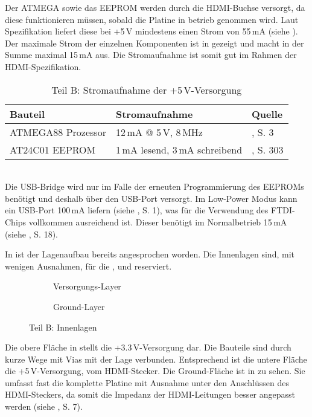 Der ATMEGA sowie das EEPROM werden durch die HDMI-Buchse versorgt, da diese funktionieren müssen, sobald die Platine in betrieb genommen wird. Laut Spezifikation liefert diese bei +5\,V mindestens einen Strom von 55\,mA (siehe \cite{HDMI11}). Der maximale Strom der einzelnen Komponenten ist in  gezeigt und macht in der Summe maximal 15\,mA aus. Die Stromaufnahme ist somit gut im Rahmen der HDMI-Spezifikation.
\begin{table}[h]
\begin{tabular}{|p{4cm}|p{5cm}|p{3.5cm}|}\hline
\rowcolor{TableBackgroundColor} 
   \textbf{Bauteil} & \textbf{Stromaufnahme} & \textbf{Quelle}	\\ \hline
    ATMEGA88 Prozessor & 12\,mA @ 5\,V, 8\,MHz	& \cite{Atmel2011}, S. 3\\ \hline
	AT24C01 EEPROM & 1\,mA lesend, 3\,mA schreibend & \cite{Atmel2003}, S. 303\\ \hline
\end{tabular}
\caption{Teil B: Stromaufnahme der +5\,V-Versorgung}
\label{tab:5v_strom}
\end{table} \\
Die USB-Bridge  wird nur im Falle der erneuten Programmierung des EEPROMs benötigt und deshalb über den USB-Port versorgt. Im Low-Power Modus kann ein USB-Port 100\,mA liefern (siehe \cite{USB2005}, S. 1), was für die Verwendung des FTDI-Chips vollkommen ausreichend ist. Dieser benötigt im Normalbetrieb 15\,mA (siehe \cite{FTDI2010}, S. 18).

In  ist der Lagenaufbau bereits angesprochen worden. Die Innenlagen sind, mit wenigen Ausnahmen, für die ,  und  reserviert. 
\begin{figure}[htbp]
        \centering
        \begin{subfigure}[htp]{0.48\textwidth}
                \caption{Versorgungs-Layer}
                \label{fig:teilb_vcc_layer}
        \end{subfigure}
		\quad 
        \begin{subfigure}[htp]{0.48\textwidth}
                             								\caption{Ground-Layer}
                \label{fig:teilb_gnd_layer}
        \end{subfigure}
        \caption{Teil B: Innenlagen}
        \label{fig:teilb_vcc_gnd_layer}
\end{figure}
Die obere Fläche in  stellt die +3.3\,V-Versorgung dar. Die Bauteile sind durch kurze Wege mit Vias mit der Lage verbunden. Entsprechend ist die untere Fläche die +5\,V-Versorgung, vom HDMI-Stecker. Die Ground-Fläche ist in  zu sehen. Sie umfasst fast die komplette Platine mit Ausnahme unter den Anschlüssen des HDMI-Steckers, da somit die Impedanz der HDMI-Leitungen besser angepasst werden (siehe \cite{TI2007}, S. 7). 